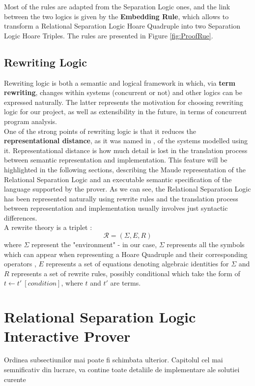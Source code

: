 \documentclass[12pt,a4paper]{article}
\begin{document}
Most of the rules are adapted from the Separation Logic ones, and the link between the two logics is given by the \textbf{Embedding Rule}, which allows to transform a Relational Separation Logic Hoare Quadruple into two Separation Logic Hoare Triples. The rules are presented in Figure \ref{fig:ProofRue}. 
\clearpage
\subsection{Rewriting Logic}
Rewriting logic is both a semantic and logical framework \cite{rewritingLogic} in which, via \textbf{term rewriting}, changes within systems (concurrent or not) and other logics can be expressed naturally. The latter represents the motivation for choosing rewriting logic for our project, as well as extensibility in the future, in terms of concurrent program analysis. \\

One of the strong points of rewriting logic is that it reduces the \textbf{representational distance}, as it was named in \cite{rewritingLogic}, of the systems modelled using it. Representational distance is how much detail is lost in the translation process between semantic representation and implementation. This feature will be highlighted in the following sections, describing the Maude representation of the Relational Separation Logic and an executable semantic specification of the language supported by the prover. As we can see, the Relational Separation Logic has been represented naturally using rewrite rules and the translation process between representation and implementation usually involves just syntactic differences.\\

A rewrite theory is a triplet : \[\mathcal{R} = (\Sigma, E, R)\]
where \(\Sigma\) represent the "environment" - in our case, \(\Sigma\) represents all the symbols which can appear when representing a Hoare Quadruple and their corresponding operators , \(E\) represents a set of equations denoting algebraic identities for \(\Sigma\) and \(R\) represents a set of rewrite rules, possibly conditional which take the form of \(t \leftarrow t\prime\ [condition]\), where \(t\) and \(t\prime\) are terms. 
\section{Relational Separation Logic Interactive Prover} 
Ordinea subsectiunilor mai poate fi schimbata ulterior. Capitolul cel mai semnificativ din lucrare, va contine toate detaliile de implementare ale solutiei curente
\end{document}
